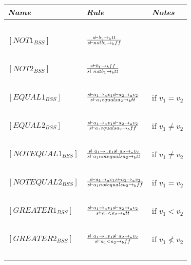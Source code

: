 \begin{table}[h]
	\begin{tabular}{|l|l|l|}
	\hline
	\emph{Name}			& \emph{Rule}																															& \emph{Notes} \\ \hline
			~			&															~																			& ~ \\
	$[NOT1_{BSS}]$		& $s \vdash b_{1} \rightarrow_{b} tt \over s \vdash not b_{1} \rightarrow_{b} ff$														& ~ \\
			~			&															~																			& ~ \\
	$[NOT2_{BSS}]$		& $s \vdash b_{1} \rightarrow_{b} ff \over s \vdash not b_{1} \rightarrow_{b} tt$														& ~ \\
			~			&															~																			& ~ \\
	$[EQUAL1_{BSS}]$	& $s \vdash a_{1} \rightarrow_{a} v_{1}  s \vdash a_{2} \rightarrow_{a} v_{2} \over s \vdash a_{1} equals a_{2} \rightarrow_{b} tt$		& if $v_{1} = v_{2}$ \\
			~			&															~																			& ~ \\
	$[EQUAL2_{BSS}]$	& $s \vdash a_{1} \rightarrow_{a} v_{1}  s \vdash a_{2} \rightarrow_{a} v_{2} \over s \vdash a_{1} equals a_{2} \rightarrow_{b} ff$		& if $v_{1} \ne v_{2}$ \\
			~			&															~																			& ~ \\
	$[NOTEQUAL1_{BSS}]$	& $s \vdash a_{1} \rightarrow_{a} v_{1}  s \vdash a_{2} \rightarrow_{a} v_{2} \over s \vdash a_{1} notequals a_{2} \rightarrow_{b} tt$	& if $v_{1}\ne v_{2}$ \\
			~			&															~																			& ~ \\
	$[NOTEQUAL2_{BSS}]$	& $s \vdash a_{1} \rightarrow_{a} v_{1}  s \vdash a_{2} \rightarrow_{a} v_{2} \over s \vdash a_{1} notequals a_{2} \rightarrow_{b} ff$	& if $v_{1} = v_{2}$ \\
			~			&															~																			& ~ \\
	$[GREATER1_{BSS}]$	& $s \vdash a_{1} \rightarrow_{a} v_{1}  s \vdash a_{2} \rightarrow_{a} v_{2} \over s \vdash a_{1} < a_{2} \rightarrow_{b} tt$			& if $v_{1} < v_{2}$ \\
			~			&															~																			& ~ \\
	$[GREATER2_{BSS}]$	& $s \vdash a_{1} \rightarrow_{a} v_{1}  s \vdash a_{2} \rightarrow_{a} v_{2} \over s \vdash a_{1} < a_{2} \rightarrow_{b} ff$			& if $v_{1} \not< v_{2}$ \\
			~			&															~																			& ~ \\

\end{tabular}
\end{table}
